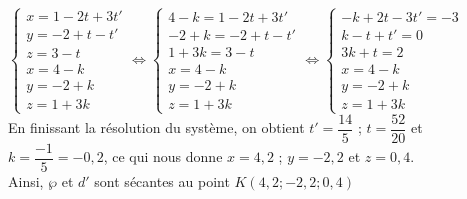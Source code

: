 \documentclass{cornouaille}
\begin{document}
\begin{methode*1}
$\begin{cases} x=1-2t+3t'\\y=-2+t-t'\\z=3-t\\x=4-k\\y=-2+k\\z=1+3k \end{cases}\Leftrightarrow \begin{cases} 4-k=1-2t+3t'\\-2+k=-2+t-t'\\1+3k=3-t\\x=4-k\\y=-2+k\\z=1+3k \end{cases}\Leftrightarrow \begin{cases} -k+2t-3t'=-3\\k-t+t'=0\\3k+t=2\\x=4-k\\y=-2+k\\z=1+3k\end{cases}$\\
En finissant la résolution du système, on obtient 
 $t'=\dfrac{14}{5}$ ; $t=\dfrac{52}{20}$ et $k=\dfrac{-1}{5}=-0,2$, ce qui nous donne $x=4,2$ ; $y=-2,2$ et $z=0,4$.\\ 
Ainsi, $\wp$ et $d'$ sont sécantes au point $K(4,2;-2,2;0,4)$

\vspace{-\baselineskip}





\end{methode*1}
\end{document}

